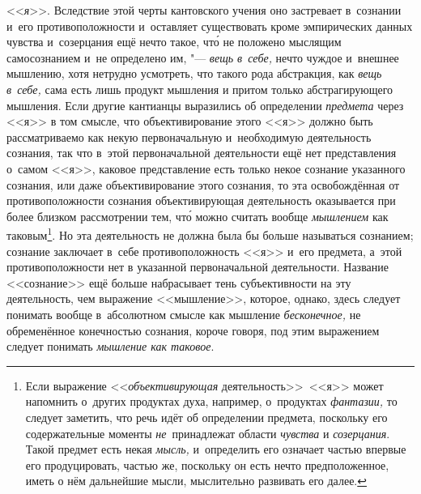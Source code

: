 <<{\em я}>>. Вследствие этой черты кантовского учения оно
застревает в~сознании и~его противоположности и~оставляет существовать
кроме эмпирических данных чувства и~созерцания ещё нечто такое, чт\'{о} не
положено мыслящим самосознанием и~не определено им, "---
{\em вещь в~себе,} нечто чуждое и~внешнее мышлению,
хотя нетрудно усмотреть, что такого рода абстракция, как
{\em вещь в~себе,} сама есть лишь продукт мышления и
притом только абстрагирующего мышления. Если другие
кантианцы
выразились об определении {\em предмета} через <<я>> в
том смысле, что объективирование этого <<я>> должно быть рассматриваемо как
некую первоначальную и~необходимую деятельность сознания, так что в~этой
первоначальной деятельности ещё нет представления о~самом <<я>>, каковое
представление есть только некое сознание указанного сознания, или даже
объективирование этого сознания, то эта освобождённая от противоположности
сознания объективирующая деятельность оказывается при более близком
рассмотрении тем, чт\'{о} можно считать вообще {\em мышлением} как
таковым\footnote{Если выражение <<{\em объективирующая} деятельность>>~<<я>>
может напомнить о~других продуктах духа, например, о~продуктах
{\em фантазии,} то следует заметить, что речь идёт об
определении предмета, поскольку его содержательные моменты
{\em не}~принадлежат области {\em чувства} и
{\em созерцания}. Такой предмет есть некая
{\em мысль,} и~определить его означает частью впервые его
продуцировать, частью же, поскольку он есть нечто предположенное, иметь о
нём дальнейшие мысли, мыслительно развивать его далее.}. Но эта деятельность
не должна была бы больше называться сознанием; сознание заключает в~себе
противоположность <<я>> и~его предмета, а~этой противоположности нет в
указанной первоначальной деятельности. Название <<сознание>> ещё больше
набрасывает тень субъективности на эту деятельность, чем выражение
<<мышление>>,
которое, однако, здесь следует понимать вообще в~абсолютном смысле как
мышление {\em бесконечное,} не обременённое конечностью
сознания, короче говоря, под этим выражением следует понимать
{\em мышление как таковое}.


